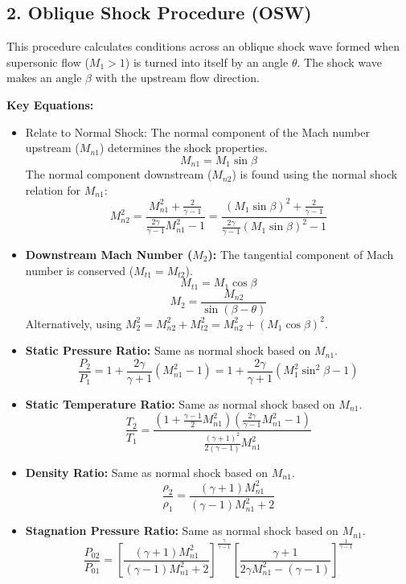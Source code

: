\hypertarget{oblique-shock-procedure-osw}{%
\subsection{2. Oblique Shock Procedure
(OSW)}\label{oblique-shock-procedure-osw}}

This procedure calculates conditions across an oblique shock wave formed
when supersonic flow (\(M_1 > 1\)) is turned into itself by an angle
\(\theta\). The shock wave makes an angle \(\beta\) with the upstream
flow direction.

\textbf{Key Equations:}

\begin{itemize}
\item
  Relate to Normal Shock: The normal component of the Mach number
  upstream (\(M_{n1}\)) determines the shock properties.
  \[ M_{n1} = M_1 \sin\beta \] The normal component downstream
  (\(M_{n2}\)) is found using the normal shock relation for \(M_{n1}\):
  \[ M_{n2}^2 = \frac{M_{n1}^2 + \frac{2}{\gamma - 1}}{\frac{2\gamma}{\gamma - 1}M_{n1}^2 - 1} = \frac{(M_1 \sin\beta)^2 + \frac{2}{\gamma - 1}}{\frac{2\gamma}{\gamma - 1}(M_1 \sin\beta)^2 - 1} \]
\item
  \textbf{Downstream Mach Number (\(M_2\)):} The tangential component of
  Mach number is conserved (\(M_{t1} = M_{t2}\)).
  \[ M_{t1} = M_1 \cos\beta \]
  \[ M_2 = \frac{M_{n2}}{\sin(\beta - \theta)} \] Alternatively, using
  \(M_2^2 = M_{n2}^2 + M_{t2}^2 = M_{n2}^2 + (M_1 \cos\beta)^2\).
\item
  \textbf{Static Pressure Ratio:} Same as normal shock based on
  \(M_{n1}\).
  \[ \frac{P_2}{P_1} = 1 + \frac{2\gamma}{\gamma + 1}(M_{n1}^2 - 1) = 1 + \frac{2\gamma}{\gamma + 1}(M_1^2 \sin^2\beta - 1) \]
\item
  \textbf{Static Temperature Ratio:} Same as normal shock based on
  \(M_{n1}\).
  \[ \frac{T_2}{T_1} = \frac{\left(1 + \frac{\gamma-1}{2}M_{n1}^2\right) \left(\frac{2\gamma}{\gamma-1}M_{n1}^2 - 1\right)}{\frac{(\gamma+1)^2}{2(\gamma-1)} M_{n1}^2} \]
\item
  \textbf{Density Ratio:} Same as normal shock based on \(M_{n1}\).
  \[ \frac{\rho_2}{\rho_1} = \frac{(\gamma + 1)M_{n1}^2}{(\gamma - 1)M_{n1}^2 + 2} \]
\item
  \textbf{Stagnation Pressure Ratio:} Same as normal shock based on
  \(M_{n1}\).
  \[ \frac{P_{02}}{P_{01}} = \left[ \frac{(\gamma + 1)M_{n1}^2}{(\gamma - 1)M_{n1}^2 + 2} \right]^{\frac{\gamma}{\gamma - 1}} \left[ \frac{\gamma + 1}{2\gamma M_{n1}^2 - (\gamma - 1)} \right]^{\frac{1}{\gamma - 1}} \]

\end{itemize}
